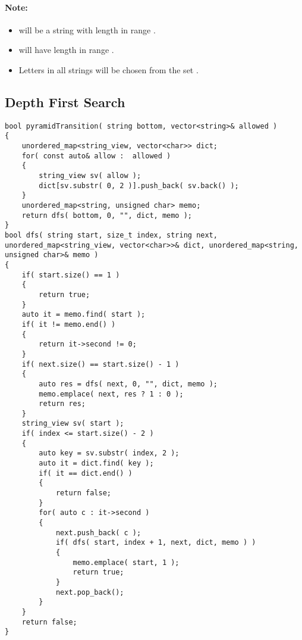 \paragraph{Note:}

\begin{itemize}
\item {} will be a string with length in range \fcj{[2, 8]}.
\item {} will have length in range \fcj{[0, 200]}.
\item Letters in all strings will be chosen from the set \fcj{['A', 'B', 'C', 'D', 'E', 'F', 'G']}.

\end{itemize}

\subsection{Depth First Search}

\setcounter{lstlisting}{0}
\begin{lstlisting}[style=customc, caption={DFS}]
bool pyramidTransition( string bottom, vector<string>& allowed )
{
    unordered_map<string_view, vector<char>> dict;
    for( const auto& allow :  allowed )
    {
        string_view sv( allow );
        dict[sv.substr( 0, 2 )].push_back( sv.back() );
    }
    unordered_map<string, unsigned char> memo;
    return dfs( bottom, 0, "", dict, memo );
}
bool dfs( string start, size_t index, string next, unordered_map<string_view, vector<char>>& dict, unordered_map<string, unsigned char>& memo )
{
    if( start.size() == 1 )
    {
        return true;
    }
    auto it = memo.find( start );
    if( it != memo.end() )
    {
        return it->second != 0;
    }
    if( next.size() == start.size() - 1 )
    {
        auto res = dfs( next, 0, "", dict, memo );
        memo.emplace( next, res ? 1 : 0 );
        return res;
    }
    string_view sv( start );
    if( index <= start.size() - 2 )
    {
        auto key = sv.substr( index, 2 );
        auto it = dict.find( key );
        if( it == dict.end() )
        {
            return false;
        }
        for( auto c : it->second )
        {
            next.push_back( c );
            if( dfs( start, index + 1, next, dict, memo ) )
            {
                memo.emplace( start, 1 );
                return true;
            }
            next.pop_back();
        }
    }
    return false;
}
\end{lstlisting}